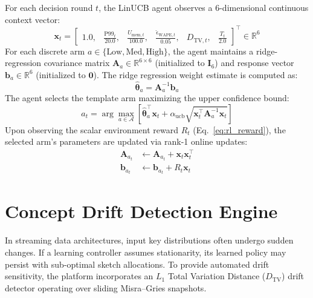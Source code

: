 For each decision round $t$, the LinUCB agent observes a 6-dimensional continuous context vector:
\begin{equation}
    \mathbf{x}_t = \begin{bmatrix} 1.0, & \frac{\text{P99}_t}{20.0}, & \frac{U_{\text{mem}, t}}{100.0}, & \frac{\hat{\epsilon}_{\text{WAPE}, t}}{0.05}, & D_{\text{TV}, t}, & \frac{T_t}{2.0} \end{bmatrix}^\top \in \mathbb{R}^6
\end{equation}
For each discrete arm $a \in \{\text{Low}, \text{Med}, \text{High}\}$, the agent maintains a ridge-regression covariance matrix $\mathbf{A}_a \in \mathbb{R}^{6 \times 6}$ (initialized to $\mathbf{I}_6$) and response vector $\mathbf{b}_a \in \mathbb{R}^6$ (initialized to $\mathbf{0}$). The ridge regression weight estimate is computed as:
\begin{equation}
    \hat{\boldsymbol{\theta}}_a = \mathbf{A}_a^{-1} \mathbf{b}_a
\end{equation}
The agent selects the template arm maximizing the upper confidence bound:
\begin{equation}
    a_t = \arg\max_{a \in \mathcal{A}} \left[ \hat{\boldsymbol{\theta}}_a^\top \mathbf{x}_t + \alpha_{\text{ucb}} \sqrt{\mathbf{x}_t^\top \mathbf{A}_a^{-1} \mathbf{x}_t} \right]
\end{equation}
Upon observing the scalar environment reward $R_t$ (Eq.~\ref{eq:rl_reward}), the selected arm's parameters are updated via rank-1 online updates:
\begin{align}
    \mathbf{A}_{a_t} &\leftarrow \mathbf{A}_{a_t} + \mathbf{x}_t \mathbf{x}_t^\top \\
    \mathbf{b}_{a_t} &\leftarrow \mathbf{b}_{a_t} + R_t \mathbf{x}_t
\end{align}

\section{Concept Drift Detection Engine}

In streaming data architectures, input key distributions often undergo sudden changes. If a learning controller assumes stationarity, its learned policy may persist with sub-optimal sketch allocations. To provide automated drift sensitivity, the platform incorporates an $L_1$ Total Variation Distance ($D_{\text{TV}}$) drift detector operating over sliding Misra--Gries snapshots.

